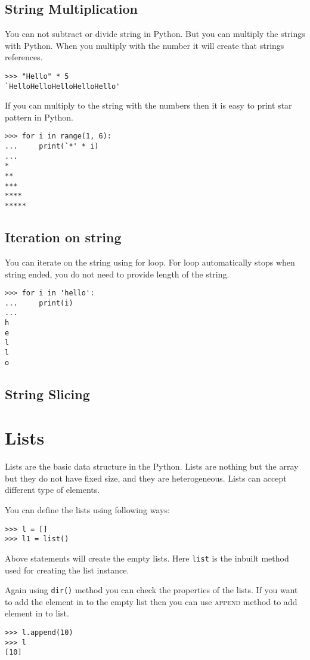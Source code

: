 \documentclass[letterpaper,12pt]{book}
\begin{document}
\subsection{String Multiplication}
You can not subtract or divide string in Python. But you can multiply the strings with Python. When you multiply with the number it will create that strings references.
\begin{verbatim}
>>> "Hello" * 5
`HelloHelloHelloHelloHello'
\end{verbatim}
If you can multiply to the string with the numbers then it is easy to print star pattern in Python.
\begin{verbatim}
>>> for i in range(1, 6):
...     print(`*' * i)
... 
*
**
***
****
*****
\end{verbatim}
\subsection{Iteration on string}
You can iterate on the string using for loop. For loop automatically stops when string ended, you do not need to provide length of the string.
\begin{verbatim}
>>> for i in 'hello':
...     print(i)
...
h
e
l
l
o
\end{verbatim}
\subsection{String Slicing}

\section{Lists}
Lists are the basic data structure in the Python. Lists are nothing but the array but they do not have fixed size, and they are heterogeneous. Lists can accept different type of elements.

You can define the lists using following ways:
\begin{verbatim}
>>> l = []
>>> l1 = list()
\end{verbatim}
Above statements will create the empty lists. Here \texttt{list} is the inbuilt method used for creating the list instance.

Again using \texttt{dir()} method you can check the properties of the lists.
If you want to add the element in to the empty list then you can use \textsc{append} method to add element in to list.
\begin{verbatim}
>>> l.append(10)
>>> l
[10]
\end{verbatim}
\end{document}
